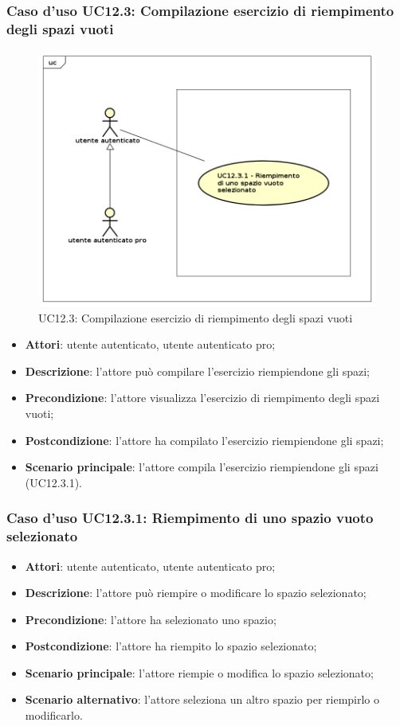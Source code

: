 \subsubsection{Caso d'uso UC12.3: Compilazione esercizio di riempimento degli spazi vuoti}
\label{UC12.3}
\begin{figure}[h]
	\centering
	\includegraphics[scale=0.5]{UML/UC12_3.png}
	\caption{UC12.3: Compilazione esercizio di riempimento degli spazi vuoti}
\end{figure}
\begin{itemize}
\item \textbf{Attori}: utente autenticato, utente autenticato pro;
\item \textbf{Descrizione}: l'attore può compilare l'esercizio riempiendone gli spazi;
\item \textbf{Precondizione}: l'attore visualizza l'esercizio di riempimento degli spazi vuoti;
\item \textbf{Postcondizione}: l'attore ha compilato l'esercizio riempiendone gli spazi;
\item \textbf{Scenario principale}: l'attore compila l'esercizio riempiendone gli spazi  (UC12.3.1).
\end{itemize}

\subsubsection{Caso d'uso UC12.3.1: Riempimento di uno spazio vuoto selezionato}
\begin{itemize}
\item \textbf{Attori}: utente autenticato, utente autenticato pro;
\item \textbf{Descrizione}: l'attore può riempire o modificare lo spazio selezionato;
\item \textbf{Precondizione}: l'attore ha selezionato uno spazio;
\item \textbf{Postcondizione}: l'attore ha riempito lo spazio selezionato;
\item \textbf{Scenario principale}: l'attore riempie o modifica lo spazio selezionato;
\item \textbf{Scenario alternativo}: l'attore seleziona un altro spazio per riempirlo o modificarlo. 
\end{itemize}

